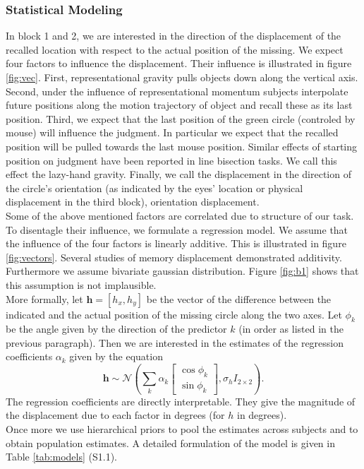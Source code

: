 \documentclass[10pt]{article}
\begin{document}
\subsubsection*{Statistical Modeling} 
In block 1 and 2, we are interested in the direction of the displacement of the recalled location with respect to the actual position of the missing. 
We expect four factors to influence the displacement. 
Their influence is illustrated in figure \ref{fig:vec}. %
First, representational gravity pulls objects down along the vertical axis. 
Second, under the influence of representational momentum subjects interpolate future positions along the motion trajectory of object and recall these as its last position. 
Third, we expect that the last position of the green circle (controled by mouse) will influence the judgment. 
In particular we expect that the recalled position will be pulled towards the last mouse position. 
Similar effects of starting position on judgment have been reported in line bisection tasks.%
We call this effect the lazy-hand gravity. 
Finally, we call the displacement in the direction of the circle's orientation (as indicated by the eyes' location or physical displacement in the third block), orientation displacement.\\
Some of the above mentioned factors are correlated due to structure of our task. 
To disentagle their influence, we formulate a regression model. 
We assume that the influence of the four factors is linearly additive. This is illustrated in figure \ref{fig:vectors}. 
Several studies of memory displacement demonstrated additivity. %
Furthermore we assume bivariate gaussian distribution. 
Figure \ref{fig:b1} shows that this assumption is not implausible.
\\ 
More formally, let $\mathbf h =[h_{x}, h_{y}]$ be the vector of the difference between the indicated and the actual position of the missing circle along the two axes. 
Let $\phi_{k}$ be the angle given by the direction of the predictor $k$ (in order as listed in the previous paragraph). 
Then we are interested in the estimates of the regression coefficients $\alpha_k$ given by the equation\\
\begin{equation}
\mathbf h \sim  \mathcal{N}\left(\sum_k \alpha_k \begin{bmatrix} \cos \phi_{k} \\ \sin \phi_{k} \end{bmatrix}, \sigma_h I_{2 \times 2} \right).
\end{equation} 
The regression coefficients are directly interpretable. 
They give the magnitude of the displacement due to each factor in degrees (for $h$ in degrees).
\\
Once more we use hierarchical priors to pool the estimates across subjects and to obtain population estimates. 
A detailed formulation of the model is given in Table \ref{tab:models} (S1.1).
\end{document}

